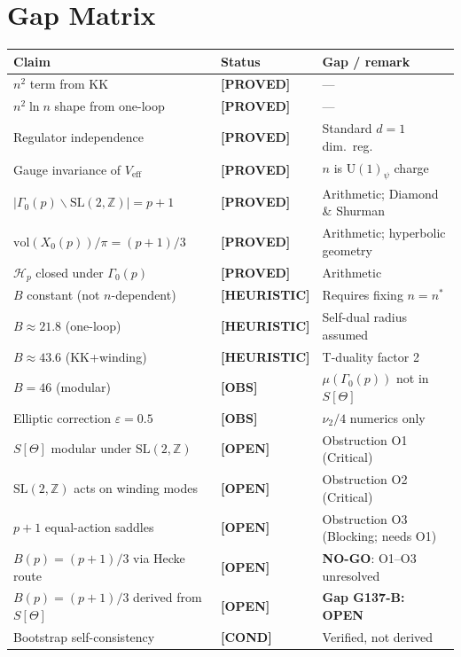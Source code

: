 \documentclass[12pt,a4paper]{article}
\theoremstyle{definition}
\theoremstyle{remark}
\newcommand{\proved}{\textcolor{green!55!black}{\textbf{[PROVED]}}}
\newcommand{\heur}{\textcolor{orange!80!black}{\textbf{[HEURISTIC]}}}
\newcommand{\cond}{\textcolor{blue!70!black}{\textbf{[COND]}}}
\newcommand{\openp}{\textcolor{red!70!black}{\textbf{[OPEN]}}}
\newcommand{\obs}{\textcolor{blue!50!black}{\textbf{[OBS]}}}
\begin{document}
\section{Gap Matrix}
\label{sec:gapmatrix}

\begin{center}
\begin{tabular}{p{4.5cm}lp{5.5cm}}
\toprule
\textbf{Claim} & \textbf{Status} & \textbf{Gap / remark} \\
\midrule
$n^2$ term from KK & \proved & --- \\
$n^2 \ln n$ shape from one-loop & \proved & --- \\
Regulator independence & \proved & Standard $d=1$ dim.\ reg. \\
Gauge invariance of $V_{\mathrm{eff}}$ & \proved & $n$ is $\mathrm{U}(1)_\psi$ charge \\
$|\Gamma_0(p)\backslash\mathrm{SL}(2,\mathbb{Z})| = p+1$ & \proved & Arithmetic; Diamond \& Shurman \\
$\mathrm{vol}(X_0(p))/\pi = (p+1)/3$ & \proved & Arithmetic; hyperbolic geometry \\
$\mathcal{H}_p$ closed under $\Gamma_0(p)$ & \proved & Arithmetic \\
$B$ constant (not $n$-dependent) & \heur & Requires fixing $n = n^*$ \\
$B \approx 21.8$ (one-loop) & \heur & Self-dual radius assumed \\
$B \approx 43.6$ (KK+winding) & \heur & T-duality factor 2 \\
$B = 46$ (modular) & \obs & $\mu(\Gamma_0(p))$ not in $S[\Theta]$ \\
Elliptic correction $\varepsilon = 0.5$ & \obs & $\nu_2/4$ numerics only \\
$S[\Theta]$ modular under $\mathrm{SL}(2,\mathbb{Z})$ & \openp & Obstruction O1 (Critical) \\
$\mathrm{SL}(2,\mathbb{Z})$ acts on winding modes & \openp & Obstruction O2 (Critical) \\
$p+1$ equal-action saddles & \openp & Obstruction O3 (Blocking; needs O1) \\
$B(p) = (p+1)/3$ via Hecke route & \openp & \textbf{NO-GO}: O1--O3 unresolved \\
$B(p) = (p+1)/3$ derived from $S[\Theta]$ & \openp & \textbf{Gap G137-B: OPEN} \\
Bootstrap self-consistency & \cond & Verified, not derived \\
\bottomrule
\end{tabular}
\end{center}
\end{document}
